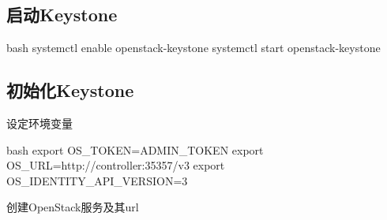 \subsection{启动Keystone}

\begin{code-block}{bash}
systemctl enable openstack-keystone
systemctl start openstack-keystone
\end{code-block}

\subsection{初始化Keystone}
设定环境变量

\begin{code-block}{bash}
export OS_TOKEN=ADMIN_TOKEN
export OS_URL=http://controller:35357/v3
export OS_IDENTITY_API_VERSION=3
\end{code-block}

创建OpenStack服务及其url

